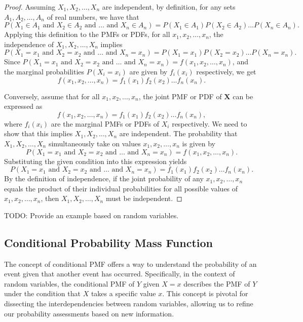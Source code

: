 \begin{proof}
Assuming \(X_1, X_2, \ldots, X_n\) are independent, by definition, for any sets \(A_1, A_2, \ldots, A_n\) of real numbers, we have that 
\[
P(X_1 \in A_1 \text{ and } X_2 \in A_2 \text{ and } \ldots \text{ and } X_n \in A_n) = P(X_1 \in A_1)P(X_2 \in A_2)\ldots P(X_n \in A_n).
\]
Applying this definition to the PMFs or PDFs, for all \(x_1, x_2, \ldots, x_n\), the independence of \(X_1, X_2, \ldots, X_n\) implies 
\[
P(X_1 = x_1 \text{ and } X_2 = x_2 \text{ and } \ldots \text{ and } X_n = x_n) = P(X_1 = x_1)P(X_2 = x_2)\ldots P(X_n = x_n).
\]
Since \(P(X_1 = x_1 \text{ and } X_2 = x_2 \text{ and } \ldots \text{ and } X_n = x_n) = f(x_1, x_2, \ldots, x_n)\), and the marginal probabilities \(P(X_i = x_i)\) are given by \(f_i(x_i)\) respectively, we get 
\[
f(x_1, x_2, \ldots, x_n) = f_1(x_1) f_2(x_2) \ldots f_n(x_n).
\]

Conversely, assume that for all \(x_1, x_2, \ldots, x_n\), the joint PMF or PDF of \(\mathbf{X}\) can be expressed as 
\[
f(x_1, x_2, \ldots, x_n) = f_1(x_1) f_2(x_2) \ldots f_n(x_n),
\]
where \(f_i(x_i)\) are the marginal PMFs or PDFs of \(X_i\) respectively. We need to show that this implies \(X_1, X_2, \ldots, X_n\) are independent. The probability that \(X_1, X_2, \ldots, X_n\) simultaneously take on values \(x_1, x_2, \ldots, x_n\) is given by 
\[
P(X_1 = x_1 \text{ and } X_2 = x_2 \text{ and } \ldots \text{ and } X_n = x_n) = f(x_1, x_2, \ldots, x_n).
\]
Substituting the given condition into this expression yields 
\[
P(X_1 = x_1 \text{ and } X_2 = x_2 \text{ and } \ldots \text{ and } X_n = x_n) = f_1(x_1) f_2(x_2) \ldots f_n(x_n).
\]
By the definition of independence, if the joint probability of any \(x_1, x_2, \ldots, x_n\) equals the product of their individual probabilities for all possible values of \(x_1, x_2, \ldots, x_n\), then \(X_1, X_2, \ldots, X_n\) must be independent.
\end{proof}

\begin{example}
{\color{red} TODO: Provide an example based on random variables.}
\end{example}


\subsection*{Conditional Probability Mass Function}

The concept of conditional PMF offers a way to understand the probability of an event given that another event has occurred. Specifically, in the context of random variables, the conditional PMF of $Y$ given $X=x$ describes the PMF of $Y$ under the condition that $X$ takes a specific value $x$. This concept is pivotal for dissecting the interdependencies between random variables, allowing us to refine our probability assessments based on new information.

